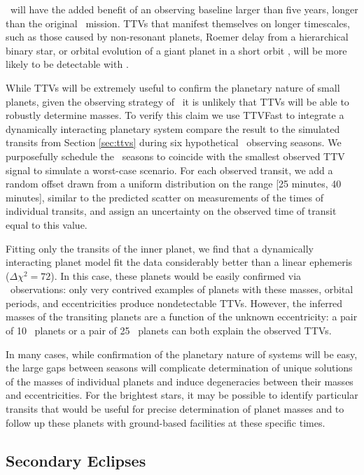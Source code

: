 \WF\ will have the added benefit of an observing baseline larger than five years, longer
than the original \kep\ mission. TTVs that manifest themselves on longer timescales, 
such as those caused by non-resonant planets, Roemer delay
from a hierarchical binary star, or orbital evolution of a giant planet in a short orbit \citep{Ragozzine09, Maciejewski16},
will be more likely to be detectable with \WF.

While TTVs will be extremely useful to confirm the planetary nature of small planets,
given the observing strategy of \WF\, it is unlikely that TTVs will be able to robustly
determine masses.
To verify this claim 
we use TTVFast \citep{Deck14} to integrate a dynamically interacting planetary system 
compare the result to the simulated transits from Section \ref{sec:ttvs}
during six hypothetical \WF\ observing seasons. 
We purposefully schedule the \WF\ seasons to coincide with the smallest observed TTV
signal to simulate a worst-case scenario.
For each observed transit, we add a random offset drawn from a uniform distribution on the
range [25 minutes, 40 minutes], similar to the predicted scatter on measurements of the times 
of individual transits, and assign an uncertainty on the observed time of transit
equal to this value. 

Fitting only the transits of the inner planet, we find that a dynamically interacting
planet model fit the data considerably better than a linear ephemeris ($\Delta \chi^2 = 72$). 
In this case, these planets would be easily confirmed via \WF\ observations:
only very contrived examples of planets with these masses, orbital periods, and 
eccentricities produce nondetectable TTVs. 
However, the inferred masses of the transiting planets are a function of the unknown
eccentricity: a pair of 10 \mearth\ planets or a pair of 25 \mearth\ planets can both
explain the observed TTVs.

In many cases, while confirmation of the planetary nature of systems will be easy, 
the large gaps between seasons will
complicate determination of unique solutions of the masses of individual planets
and induce
degeneracies between their masses and eccentricities.
For the brightest stars, it may be possible to identify particular transits that would
be useful for precise determination of planet masses and to follow up these planets with
ground-based
facilities at these specific times.


\subsection{Secondary Eclipses}


